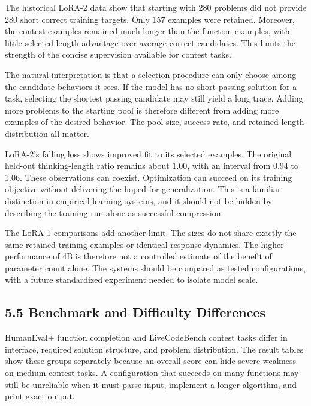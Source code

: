 \documentclass[11pt,letterpaper]{article}
\begin{document}
The historical LoRA-2 data show that starting with 280 problems did not provide 280 short correct training targets. Only 157 examples were retained. Moreover, the contest examples remained much longer than the function examples, with little selected-length advantage over average correct candidates. This limits the strength of the concise supervision available for contest tasks.\par

The natural interpretation is that a selection procedure can only choose among the candidate behaviors it sees. If the model has no short passing solution for a task, selecting the shortest passing candidate may still yield a long trace. Adding more problems to the starting pool is therefore different from adding more examples of the desired behavior. The pool size, success rate, and retained-length distribution all matter.\par

LoRA-2's falling loss shows improved fit to its selected examples. The original held-out thinking-length ratio remains about 1.00, with an interval from 0.94 to 1.06. These observations can coexist. Optimization can succeed on its training objective without delivering the hoped-for generalization. This is a familiar distinction in empirical learning systems, and it should not be hidden by describing the training run alone as successful compression.\par

The LoRA-1 comparisons add another limit. The sizes do not share exactly the same retained training examples or identical response dynamics. The higher performance of 4B is therefore not a controlled estimate of the benefit of parameter count alone. The systems should be compared as tested configurations, with a future standardized experiment needed to isolate model scale.\par

\subsection*{5.5 Benchmark and Difficulty Differences}

HumanEval+ function completion and LiveCodeBench contest tasks differ in interface, required solution structure, and problem distribution. The result tables show these groups separately because an overall score can hide severe weakness on medium contest tasks. A configuration that succeeds on many functions may still be unreliable when it must parse input, implement a longer algorithm, and print exact output.\par
\end{document}
